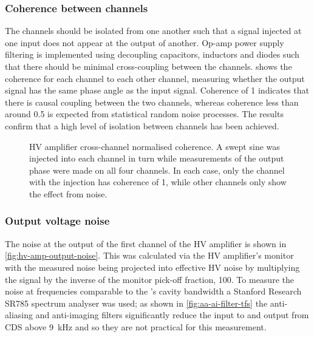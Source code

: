 \subsubsection{Coherence between channels}
The channels should be isolated from one another such that a signal injected at one input does not appear at the output of another. Op-amp power supply filtering is implemented using decoupling capacitors, inductors and diodes such that there should be minimal cross-coupling between the channels.  shows the coherence for each channel to each other channel, measuring whether the output signal has the same phase angle as the input signal. Coherence of \num{1} indicates that there is causal coupling between the two channels, whereas coherence less than around \num{0.5} is expected from statistical random noise processes. The results confirm that a high level of isolation between channels has been achieved.

\begin{figure}[htp]
  \centering
  
  \caption[High voltage amplifier cross-channel coherence]{\gls{HV} amplifier cross-channel normalised coherence. A swept sine was injected into each channel in turn while measurements of the output phase were made on all four channels. In each case, only the channel with the injection has coherence of \num{1}, while other channels only show the effect from noise.}
  \label{fig:hv-amp-coherence}
\end{figure}

\subsubsection{Output voltage noise}
The noise at the output of the first channel of the \gls{HV} amplifier is shown in \cref{fig:hv-amp-output-noise}. This was calculated via the \gls{HV} amplifier's monitor with the measured noise being projected into effective \gls{HV} noise by multiplying the signal by the inverse of the monitor pick-off fraction, \num{100}. To measure the noise at frequencies comparable to the \SSMEXPT{}'s cavity bandwidth a Stanford Research SR785 spectrum analyser was used; as shown in \cref{fig:aa-ai-filter-tfs} the anti-aliasing and anti-imaging filters significantly reduce the input to and output from \gls{CDS} above \SI{9}{\kilo\hertz} and so they are not practical for this measurement.

